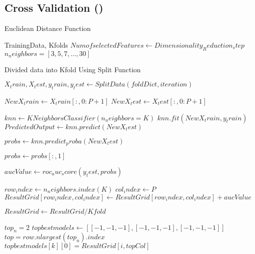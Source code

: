 \documentclass{article}
\begin{document}
 \subsection{Cross Validation ()}
\begin{algorithm}[H]
\caption{Euclidean Distance Function}
\begin{algorithmic}[1]
\REQUIRE TrainingData, Kfolds
\STATE   $ NumofselectedFeatures \gets Dimensionality_Reduction_step$
\STATE    $ n_neighbors=[3,5,7,...,30]$

 \STATE   Divided data into Kfold Using Split Function
  
     \STATE     $ X_train, X_test, y_train, y_test \gets SplitData(foldDict,iteration)$ 
       
          \STATE  $ NewX_train \gets X_train[:,0:P+1]$ 
           \STATE $ NewX_test \gets X_test[:,0:P+1] $
            
         
               \STATE $ knn \gets KNeighborsClassifier(n_neighbors=K)$ 
               \STATE $ knn.fit(NewX_train, y_train)$ 
               \STATE $ PredictedOutput \gets knn.predict(NewX_test)$ 
               
                \STATE $ probs \gets knn.predict_proba(NewX_test)$ 
                
               \STATE $ probs \gets probs[:, 1]$  
             
                \STATE $ aucValue \gets roc_auc_score(y_test, probs)$ 
               
               
                \STATE $ row_index \gets n_neighbors.index(K)$ 
               \STATE $ col_index \gets P $ 
               \STATE $ ResultGrid[row_index,col_index] \gets ResultGrid [row_index,col_index]+aucValue$ 
\ENDFOR
\ENDFOR
\ENDFOR
       
    
     \STATE $ ResultGrid \gets ResultGrid/ Kfold $  
   
   
    
     \STATE $ top_n = 2 $
     \STATE $topbestmodels  \gets [[-1,-1,-1], [-1,-1,-1], [-1,-1,-1]]$
           \STATE  $top = row.nlargest(top_n).index$
   				 \STATE$  topbestmodels[k][0]=ResultGrid [i, topCol]$
                

\end{algorithmic}
\end{algorithm}
\end{document}
